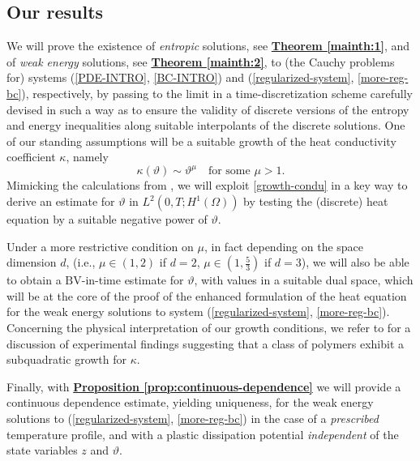 \documentclass[a4paper,10pt,reqno]{amsart}
\numberwithin{equation}{section}
\numberwithin{equation}{section}
\newcommand{\teta}{\vartheta}
\newcommand{\condu}{\kappa}
\newcommand{\EEE}{\color{black}}
\newcommand{\MMM}{\color{black}}%
\begin{document}
\subsection{Our results}
\label{ss:1.3}
We will  prove the existence  of  \emph{entropic} solutions, see \underline{\textbf{Theorem \ref{mainth:1}}}, and of \emph{weak energy} solutions,    see \underline{\textbf{Theorem \ref{mainth:2}}},   to   (the Cauchy problems for) 
systems (\ref{PDE-INTRO}, \ref{BC-INTRO})  and (\ref{regularized-system}, \ref{more-reg-bc}), respectively, by passing to the limit in a  time-discretization scheme carefully devised in such a way as to ensure the validity of  discrete versions of the  entropy and   energy inequalities along suitable interpolants of the discrete solutions. 
One of our standing assumptions will be a suitable growth of the heat conductivity coefficient $\condu$, namely
\begin{equation}
\label{growth-condu}
\condu(\teta) \sim \teta^\mu \quad \text{for some  } \mu >1.
\end{equation}
Mimicking the calculations from \cite{FPR09, Rocca-Rossi}, we will exploit \eqref{growth-condu} in a key way to derive an estimate for $\teta$ in 
$L^2(0,T;H^1(\Omega))$ by testing the (discrete) heat equation   by a suitable negative power of $\teta$. 
\par
Under a more restrictive condition on $\mu$, in fact depending on the space dimension $d$, 
\MMM (i.e., $\mu\in (1,2)$ if $d=2$, $\mu \in (1,\tfrac53)$ if $d=3$), \EEE
we will also be able to obtain a $\mathrm{BV}$-in-time estimate for $\teta$, with values in a suitable dual space, which will be at the core of the proof of the enhanced formulation of the heat equation for the weak energy solutions to system (\ref{regularized-system}, \ref{more-reg-bc}).
\MMM Concerning the physical interpretation of our growth conditions, we refer to \cite{Klein2012} for a discussion of 
 experimental findings suggesting that
a class of polymers exhibit a subquadratic growth for $\condu$. \EEE 
\par
Finally, with \underline{\textbf{Proposition \ref{prop:continuous-dependence}}} we will provide a continuous dependence estimate, yielding uniqueness, for the weak energy solutions to  (\ref{regularized-system}, \ref{more-reg-bc}) in the \MMM case of a  \emph{prescribed} temperature profile, \EEE and with a plastic dissipation potential \emph{independent} of the state variables $z$ and $\teta$. 
\end{document}

